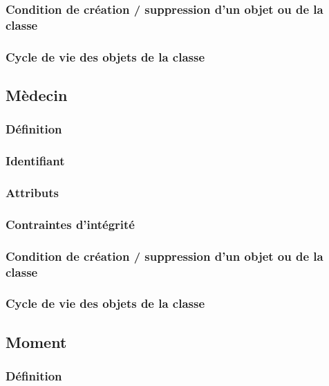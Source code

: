 \documentclass[a4paper, 11pt]{report}
\begin{document}
\subsubsection{Condition de création / suppression d'un objet ou de la classe}

\subsubsection{Cycle de vie des objets de la classe}

\subsection{Mèdecin}

\subsubsection{Définition}

\subsubsection{Identifiant}

\subsubsection{Attributs}

\subsubsection{Contraintes d'intégrité}

\subsubsection{Condition de création / suppression d'un objet ou de la classe}

\subsubsection{Cycle de vie des objets de la classe}

\subsection{Moment}

\subsubsection{Définition}
\end{document}
